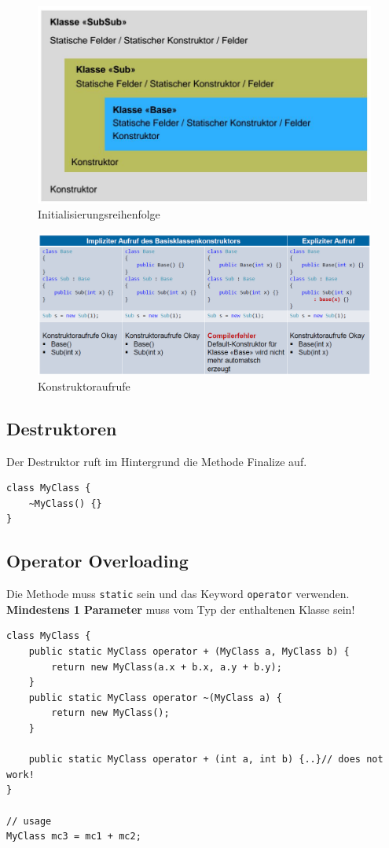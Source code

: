 \begin{figure}[h]
\centering
\includegraphics[width=0.9\linewidth]{images/initialisierungsreihenfolge}
\caption{Initialisierungsreihenfolge}
\label{fig:initialisierungsreihenfolge}
\end{figure}

\begin{figure}[h]
\centering
\includegraphics[width=\linewidth]{images/init_constructors}
\caption{Konstruktoraufrufe}
\label{fig:initconstructors}
\end{figure}

\subsection{Destruktoren}
Der Destruktor ruft im Hintergrund die Methode Finalize auf. 
\begin{lstlisting}
class MyClass {
	~MyClass() {}
}
\end{lstlisting}

\subsection{Operator Overloading}
Die Methode muss \lstinline|static| sein und das Keyword \lstinline|operator| verwenden. \textbf{Mindestens 1 Parameter} muss vom Typ der enthaltenen Klasse sein!
\begin{lstlisting}
class MyClass {
	public static MyClass operator + (MyClass a, MyClass b) {
		return new MyClass(a.x + b.x, a.y + b.y);
	}
	public static MyClass operator ~(MyClass a) {
		return new MyClass();
	}
	
	public static MyClass operator + (int a, int b) {..}// does not work!
}

// usage
MyClass mc3 = mc1 + mc2;
\end{lstlisting}

